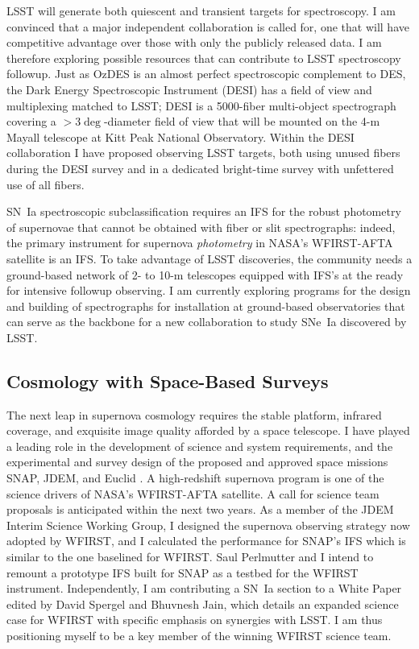 \documentclass[12pt]{article}
\begin{document}
LSST will generate both quiescent and transient targets for spectroscopy.  I am convinced that
a major independent collaboration is called for, one that will have competitive advantage over those with only
the publicly released data.
I am therefore exploring possible resources that can contribute to LSST spectroscopy followup.
Just as OzDES is an almost perfect spectroscopic complement to  DES, 
the Dark Energy Spectroscopic Instrument (DESI)  has a field of view and multiplexing matched to LSST;
DESI is a 5000-fiber multi-object spectrograph covering a $>3\deg$-diameter
field of view that will be mounted on the 4-m Mayall telescope at Kitt Peak National Observatory.   Within the DESI collaboration I have proposed observing LSST targets, both using unused fibers during the
DESI survey and in a dedicated bright-time survey
with unfettered use of all fibers.

SN~Ia spectroscopic subclassification requires an IFS for
the robust photometry of supernovae that cannot be obtained with fiber or slit spectrographs:
indeed, the primary  instrument for supernova {\it photometry} in NASA's WFIRST-AFTA satellite is an IFS.  To take
advantage of LSST discoveries, the community needs a ground-based
network of 2- to 10-m telescopes equipped with  IFS's at the ready for intensive followup observing.  I am currently exploring
programs for the design and building of spectrographs for installation at ground-based
observatories that  can serve as the backbone for a
new collaboration to study SNe~Ia discovered by LSST. 

\subsection{Cosmology with Space-Based Surveys}
The next leap in supernova cosmology requires the stable platform, infrared coverage, and exquisite image
quality afforded by a space telescope.  I have played a leading role in the development
of science and system requirements, and the experimental and survey design of the proposed
and approved space missions SNAP, JDEM, and Euclid
\cite{2006PASP..118..205D, 2011PASP..123..470S, 2013Fourspring, 2014arXiv1409.8562A}.
A  high-redshift supernova program is one of the science 
drivers of
NASA's WFIRST-AFTA satellite.  A call for science team
proposals is anticipated  within the next two years.  As a member of the JDEM Interim Science Working Group, I designed the
supernova observing strategy now adopted by WFIRST, and I calculated the performance for SNAP's IFS which is similar to the one baselined for WFIRST.  Saul Perlmutter and I intend
to remount a prototype IFS built for SNAP as a testbed for
the WFIRST instrument.  Independently, I am contributing a SN~Ia  section to a White Paper 
edited by David Spergel and Bhuvnesh
Jain, which details an expanded science case for WFIRST with specific emphasis
on synergies with LSST.  I am thus positioning myself to be a key member of the winning WFIRST science
team.
\end{document}
